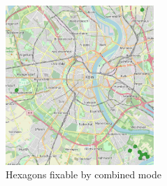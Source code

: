 \begin{figure}
  \begin{center}
    \includegraphics[width=0.50\textwidth]{Figures/results/problematic_hexagons/combined_hexagons}
  \end{center}
  \caption{Hexagons fixable by combined mode}
  \label{fig:combined_hexagons}
\end{figure}
